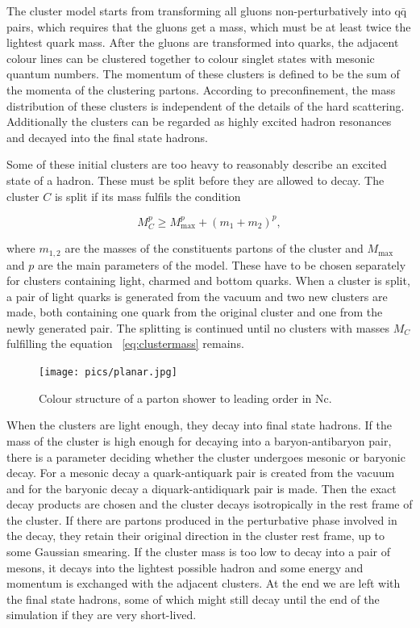 The cluster model starts from transforming all gluons non-perturbatively into $\mathrm{q \bar q}$ pairs, which requires that the gluons get a mass, which must be at least twice the lightest quark mass. After the gluons are transformed into quarks, the adjacent colour lines can be clustered together to colour singlet states with mesonic quantum numbers. The momentum of these clusters is defined to be the sum of the momenta of the clustering partons. According to preconfinement, the mass distribution of these clusters is independent of the details of the hard scattering. Additionally the clusters can be regarded as highly excited hadron resonances and decayed into the final state hadrons.

Some of these initial clusters are too heavy to reasonably describe an excited state of a hadron. These must be
split before they are allowed to decay. The cluster $C$ is split if its mass fulfils the condition~\cite{}

\begin{equation}
M_C^p \geq M_\mathrm{max}^p  + \left( m_1 + m_2\right)^p,
\label{eq:clustermass}
\end{equation}

\noindent where $m_{1,2}$ are the masses of the constituents partons of the cluster and $M_\mathrm{max}$ and $p$ are the main parameters of the model. These have to be chosen separately for clusters containing light, charmed and bottom quarks. When a cluster is split, a pair of light quarks is generated from the vacuum and two new clusters are made, both containing one quark from the original cluster and one from the newly generated pair. The splitting is continued until no clusters with masses $M_C$ fulfilling the equation ~\ref{eq:clustermass} remains.

\begin{figure}
\centering
\texttt{[image: pics/planar.jpg]}
\caption[]{ Colour structure of a parton shower to leading order in Nc.
\cite{eventGenerators} }
\label{fig:colourstructure}
\end{figure}

When the clusters are light enough, they decay into final state hadrons. If the mass of the cluster is high enough for decaying into a baryon-antibaryon pair, there is a parameter deciding whether the cluster undergoes mesonic or baryonic decay. For a mesonic decay a quark-antiquark pair is created from the vacuum and for the baryonic decay a diquark-antidiquark pair is made. Then the exact decay products are chosen and the cluster decays isotropically in the rest frame of the cluster. If there are partons produced in the perturbative phase involved in the decay, they retain their original direction in the cluster rest frame, up to some Gaussian smearing. If the cluster mass is too low to decay into a pair of mesons, it decays into the lightest possible hadron and some energy and momentum is exchanged with the adjacent clusters. At the end we are left with the final state hadrons, some of which might still decay until the end of the simulation if they are very short-lived.~\cite{} 

